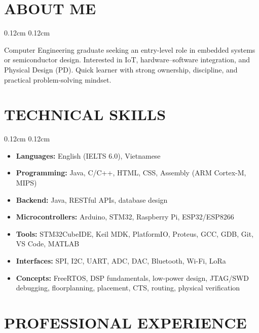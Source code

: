 \documentclass[10pt, letterpaper]{article}
\newenvironment{highlights}{
    \begin{itemize}[
        topsep=0.08cm,
        parsep=0.04cm,
        partopsep=0pt,
        itemsep=0.05cm,
        leftmargin=0.36cm + 10pt 
    ]
}{
    \end{itemize}
}
\newenvironment{onecolentry}{
    \begin{adjustwidth}{
        0.12cm 
    }{
        0.12cm
    }
}{
    \end{adjustwidth}
}
\begin{document}
\vspace{0.20cm}

\section{ABOUT ME}
\begin{onecolentry}
    Computer Engineering graduate seeking an entry-level role in embedded systems or semiconductor design. Interested in IoT, hardware--software integration, and Physical Design (PD). Quick learner with strong ownership, discipline, and practical problem-solving mindset.
\end{onecolentry}

\section{TECHNICAL SKILLS}
\begin{onecolentry}
    \begin{highlights}
        \item \textbf{Languages:} English (IELTS 6.0), Vietnamese
        \item \textbf{Programming:} Java, C/C++, HTML, CSS, Assembly (ARM Cortex-M, MIPS)
        \item \textbf{Backend:} Java, RESTful APIs, database design
        \item \textbf{Microcontrollers:} Arduino, STM32, Raspberry Pi, ESP32/ESP8266
        \item \textbf{Tools:} STM32CubeIDE, Keil MDK, PlatformIO, Proteus, GCC, GDB, Git, VS Code, MATLAB
        \item \textbf{Interfaces:} SPI, I2C, UART, ADC, DAC, Bluetooth, Wi-Fi, LoRa
        \item \textbf{Concepts:} FreeRTOS, DSP fundamentals, low-power design, JTAG/SWD debugging, floorplanning, placement, CTS, routing, physical verification
    \end{highlights}
\end{onecolentry}
\vspace{0.08cm}

\section{PROFESSIONAL EXPERIENCE}
\end{document}
